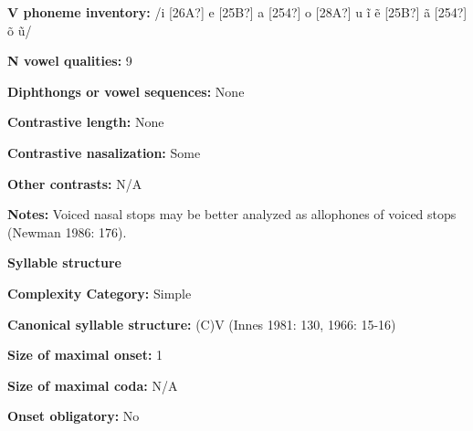 \begin{styleBody}
\textbf{V phoneme inventory:} /i [26A?] e [25B?] a [254?] o [28A?] u \~{i} \~{e} [25B?] \~{a} [254?] \~{o} \~{u}/
\end{styleBody}

\begin{styleBody}
\textbf{N vowel qualities: }9
\end{styleBody}

\begin{styleBody}
\textbf{Diphthongs or vowel sequences: }None
\end{styleBody}

\begin{styleBody}
\textbf{Contrastive length: }None
\end{styleBody}

\begin{styleBody}
\textbf{Contrastive nasalization: }Some
\end{styleBody}

\begin{styleBody}
\textbf{Other contrasts: }N/A
\end{styleBody}

\begin{styleBody}
\textbf{Notes:} Voiced nasal stops may be better analyzed as allophones of voiced stops (Newman 1986: 176).
\end{styleBody}

\begin{styleBody}
\textbf{Syllable structure}
\end{styleBody}

\begin{styleBody}
\textbf{Complexity Category:} Simple
\end{styleBody}

\begin{styleBody}
\textbf{Canonical syllable structure:} (C)V\textbf{ }(Innes 1981: 130, 1966: 15-16)
\end{styleBody}

\begin{styleBody}
\textbf{Size of maximal onset:} 1
\end{styleBody}

\begin{styleBody}
\textbf{Size of maximal coda:} N/A
\end{styleBody}

\begin{styleBody}
\textbf{Onset obligatory:} No
\end{styleBody}

